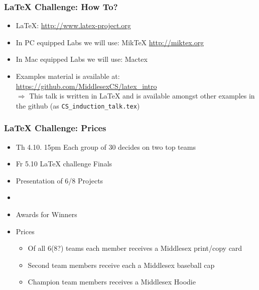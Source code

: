 \documentclass{beamer}
\begin{document}
\begin{frame}
\frametitle{LaTeX Challenge: How To?}
\begin{itemize}
\item LaTeX: \url{http://www.latex-project.org}
\item In PC equipped Labs we will use: MikTeX \url{http://miktex.org}
\item In Mac equipped Labs we will use: Mactex 
\item Examples material is available at: 
\url{https://github.com/MiddlesexCS/latex_intro} \\
\alert{$\Rightarrow$} This talk is written in LaTeX
  and is available amongst other examples in the github (as \texttt{CS\_induction\_talk.tex})
\end{itemize}
\end{frame}

\begin{frame}
\frametitle{LaTeX Challenge: Prices}
\begin{itemize}
\item \alert{Th 4.10. 15pm} Each group of 30 decides on two top teams
\item \alert{Fr 5.10} LaTeX challenge Finals
\item Presentation of 6/8 Projects
\item 
\item Awards for Winners
\item \alert{Prices}
\begin{itemize}
\item<1-3> Of all 6(8?) teams each member receives a Middlesex print/copy card
\item<2-3> Second team members receive each a Middlesex baseball cap
\item<3> Champion team members receives a Middlesex Hoodie
\end{itemize}
\end{itemize}
\end{frame}
\end{document}

